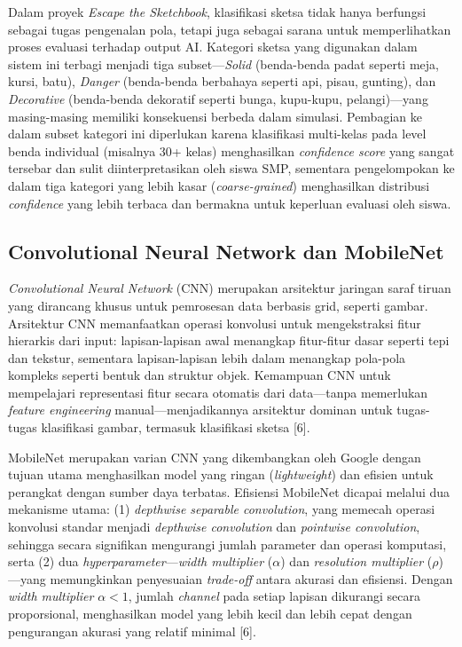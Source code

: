 \documentclass[10pt,twoside,openright]{report}
\begin{document}
Dalam proyek \textit{Escape the Sketchbook}, klasifikasi sketsa tidak hanya berfungsi sebagai tugas pengenalan pola, tetapi juga sebagai sarana untuk memperlihatkan proses evaluasi terhadap output AI. Kategori sketsa yang digunakan dalam sistem ini terbagi menjadi tiga subset—\textit{Solid} (benda-benda padat seperti meja, kursi, batu), \textit{Danger} (benda-benda berbahaya seperti api, pisau, gunting), dan \textit{Decorative} (benda-benda dekoratif seperti bunga, kupu-kupu, pelangi)—yang masing-masing memiliki konsekuensi berbeda dalam simulasi. Pembagian ke dalam subset kategori ini diperlukan karena klasifikasi multi-kelas pada level benda individual (misalnya 30+ kelas) menghasilkan \textit{confidence score} yang sangat tersebar dan sulit diinterpretasikan oleh siswa SMP, sementara pengelompokan ke dalam tiga kategori yang lebih kasar (\textit{coarse-grained}) menghasilkan distribusi \textit{confidence} yang lebih terbaca dan bermakna untuk keperluan evaluasi oleh siswa.

\subsection{Convolutional Neural Network dan MobileNet}
\label{subsec:cnn-mobilenet}

\textit{Convolutional Neural Network} (CNN) merupakan arsitektur jaringan saraf tiruan yang dirancang khusus untuk pemrosesan data berbasis grid, seperti gambar. Arsitektur CNN memanfaatkan operasi konvolusi untuk mengekstraksi fitur hierarkis dari input: lapisan-lapisan awal menangkap fitur-fitur dasar seperti tepi dan tekstur, sementara lapisan-lapisan lebih dalam menangkap pola-pola kompleks seperti bentuk dan struktur objek. Kemampuan CNN untuk mempelajari representasi fitur secara otomatis dari data—tanpa memerlukan \textit{feature engineering} manual—menjadikannya arsitektur dominan untuk tugas-tugas klasifikasi gambar, termasuk klasifikasi sketsa [6].

MobileNet merupakan varian CNN yang dikembangkan oleh Google dengan tujuan utama menghasilkan model yang ringan (\textit{lightweight}) dan efisien untuk perangkat dengan sumber daya terbatas. Efisiensi MobileNet dicapai melalui dua mekanisme utama: (1) \textit{depthwise separable convolution}, yang memecah operasi konvolusi standar menjadi \textit{depthwise convolution} dan \textit{pointwise convolution}, sehingga secara signifikan mengurangi jumlah parameter dan operasi komputasi, serta (2) dua \textit{hyperparameter}—\textit{width multiplier} ($\alpha$) dan \textit{resolution multiplier} ($\rho$)—yang memungkinkan penyesuaian \textit{trade-off} antara akurasi dan efisiensi. Dengan \textit{width multiplier} $\alpha < 1$, jumlah \textit{channel} pada setiap lapisan dikurangi secara proporsional, menghasilkan model yang lebih kecil dan lebih cepat dengan pengurangan akurasi yang relatif minimal [6].
\end{document}
